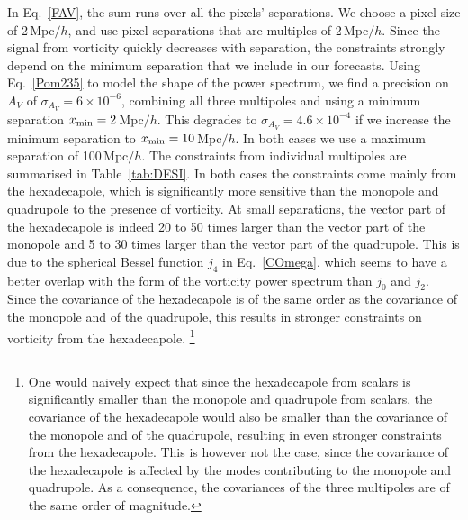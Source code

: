 \documentclass[a4paper,twocolumn,aps,prd,nolongbibliography,superscriptaddress,showpacs,showkeys,amsmath,amssymb,floatfix,nofootinbib]{revtex4-1}
\renewcommand{\[}{\begin{equation}}
\renewcommand{\]}{\end{equation}}
\begin{document}
In Eq.~\eqref{FAV}, the sum runs over all the pixels' separations. We choose a pixel size of 2\,Mpc$/h$, and use pixel separations that are multiples of 2\,Mpc$/h$. Since the signal from vorticity quickly decreases with separation, the constraints strongly depend on the minimum separation that we include in our forecasts. Using  Eq.~\eqref{Pom235} to model the shape of the power spectrum, we find a precision on $A_V$ of $\sigma_{A_V}=6\times 10^{-6}$, combining all three multipoles and using a minimum separation $x_{\rm min}=2$\,Mpc$/h$. This degrades to $\sigma_{A_V}=4.6\times 10^{-4}$ if we increase the minimum separation to $x_{\rm min}=10$\,Mpc$/h$. In both cases we use a maximum separation of 100\,Mpc$/h$. The constraints from individual multipoles are summarised in Table~\ref{tab:DESI}. In both cases the constraints come mainly from the hexadecapole, which is significantly more sensitive than the monopole and quadrupole to the presence of vorticity. At small separations, the vector part of the hexadecapole is indeed 20 to 50 times larger than the vector part of the monopole and 5 to 30 times larger than the vector part of the quadrupole. This is due to the spherical Bessel function $j_4$ in Eq.~\eqref{COmega}, which seems to have a better overlap with the form of the vorticity power spectrum than $j_0$ and $j_2$. Since the covariance of the hexadecapole is of the same order as the covariance of the monopole and of the quadrupole, this results in stronger constraints on vorticity from the hexadecapole.%
\footnote{One would naively expect that since the hexadecapole from scalars is significantly smaller than the monopole and quadrupole from scalars, the covariance of the hexadecapole would also be smaller than the covariance of the monopole and of the quadrupole, resulting in even stronger constraints from the hexadecapole. This is however not the case, since the covariance of the hexadecapole is affected by the modes contributing to the monopole and quadrupole. As a consequence, the covariances of the three multipoles are of the same order of magnitude.} %
\end{document}

